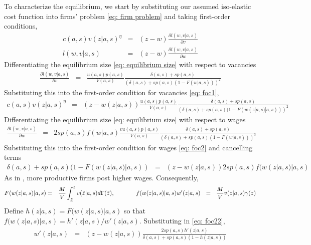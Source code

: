 To characterize the equilibrium, we start by substituting our assumed iso-elastic cost function into firms' problem \eqref{eq: firm problem} and taking first-order conditions,
\begin{eqnarray}
c(a,s) v(z|a,s)^{\eta} &=& \left(z-w\right)\frac{\partial l\left(w,v|a,s\right)}{\partial v} \label{eq: foc1} \\
l(w,v|a,s) &=& \left(z-w\right)\frac{\partial l\left(w,v|a,s\right)}{\partial w} \label{eq: foc2}
\end{eqnarray}
Differentiating the equilibrium size \eqref{eq: equilibrium size} with respect to vacancies
\begin{eqnarray*}
\frac{\partial l\left(w,v|a,s\right)}{\partial v} &=& \frac{u(a,s) p(a,s) }{V(a,s)} \frac{\delta(a,s) + sp(a,s)}{\left(\delta(a,s)+sp(a,s)(1-F(w|a,s))\right)^2}
\end{eqnarray*}
Substituting this into the first-order condition for vacancies \eqref{eq: foc1},
\begin{eqnarray}\label{eq: foc12}
c(a,s) v(z|a,s)^{\eta} &=& \left(z-w(z|a,s)\right) \frac{u(a,s) p(a,s) }{V(a,s)} \frac{\delta(a,s) + sp(a,s)}{\left(\delta(a,s)+sp(a,s)(1-F(w(z|a,s)|a,s))\right)^2}
\end{eqnarray}
Differentiating the equilibrium size \eqref{eq: equilibrium size} with respect to wages
\begin{eqnarray*}
\frac{\partial l\left(w,v|a,s\right)}{\partial w} &=& 2sp(a,s)f(w|a,s)\frac{v u(a,s) p(a,s) }{V(a,s)} \frac{\delta(a,s) + sp(a,s)}{\left(\delta(a,s)+sp(a,s)(1-F(w|a,s))\right)^3}
\end{eqnarray*}
Substituting this into the first-order condition for wages \eqref{eq: foc2} and cancelling terms
\begin{eqnarray}\label{eq: foc22}
\delta(a,s)+sp(a,s)(1-F(w(z|a,s)|a,s)) &=& \left(z-w(z|a,s)\right) 2sp(a,s)f(w(z|a,s)|a,s)
\end{eqnarray}
As in , more productive firms post higher wages. Consequently,
\begin{eqnarray*}
F(w(z|a,s)|a,s) &=& \frac{M}{V} \int_{\underline{z}}^{z} v(\tilde{z}|a,s) d\Gamma(\tilde{z}), \hspace{.5in} f(w(z|a,s)|a,s)w'(z|a,s) \ \ = \ \ \frac{M}{V} v(z|a,s) \gamma(z)
\end{eqnarray*}
Define $h(z|a,s)=F(w(z|a,s)|a,s)$ so that $f(w(z|a,s)|a,s)= h'(z|a,s) / w'(z|a,s)$. Substituting in \eqref{eq: foc22},
\begin{eqnarray}\label{eq: foc23}
w'(z|a,s) &=& \left(z-w(z|a,s)\right) \frac{2sp(a,s)h'(z|a,s)}{\delta(a,s)+sp(a,s)(1-h(z|a,s))}
\end{eqnarray}

